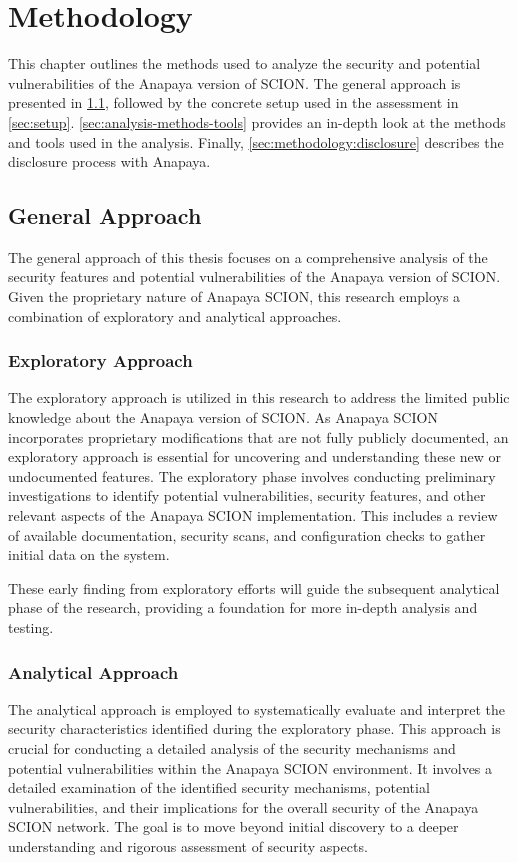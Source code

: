 \chapter{Methodology}
\label{ch:methodology}

This chapter outlines the methods used to analyze the security and potential vulnerabilities of the Anapaya version of SCION.
The general approach is presented in \cref{sec:general-approach}, followed by the concrete setup used in the assessment in \cref{sec:setup}.
\cref{sec:analysis-methods-tools} provides an in-depth look at the methods and tools used in the analysis.
Finally, \cref{sec:methodology:disclosure} describes the disclosure process with Anapaya.


\section{General Approach}
\label{sec:general-approach}
The general approach of this thesis focuses on a comprehensive analysis of the security features and potential vulnerabilities of the Anapaya version of SCION.
Given the proprietary nature of Anapaya SCION, this research employs a combination of exploratory and analytical approaches.

\subsection{Exploratory Approach}
The exploratory approach is utilized in this research to address the limited public knowledge about the Anapaya version of SCION.
As Anapaya SCION incorporates proprietary modifications that are not fully publicly documented, an exploratory approach is essential for uncovering and understanding these new or undocumented features.
The exploratory phase involves conducting preliminary investigations to identify potential vulnerabilities, security features, and other relevant aspects of the Anapaya SCION implementation.
This includes a review of available documentation, security scans, and configuration checks to gather initial data on the system.

These early finding from exploratory efforts will guide the subsequent analytical phase of the research, providing a foundation for more in-depth analysis and testing.

\subsection{Analytical Approach}
The analytical approach is employed to systematically evaluate and interpret the security characteristics identified during the exploratory phase.
This approach is crucial for conducting a detailed analysis of the security mechanisms and potential vulnerabilities within the Anapaya SCION environment.
It involves a detailed examination of the identified security mechanisms, potential vulnerabilities, and their implications for the overall security of the Anapaya SCION network.
The goal is to move beyond initial discovery to a deeper understanding and rigorous assessment of security aspects.


